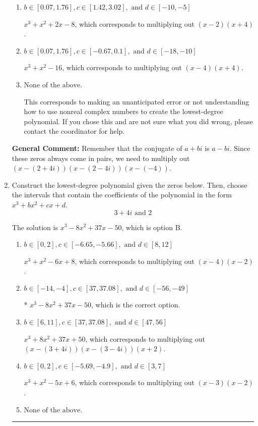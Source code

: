 \documentclass{extbook}[14pt]
\newcommand{\litem}[1]{\item #1

\rule{\textwidth}{0.4pt}}
\begin{document}
\begin{enumerate}
{\begin{enumerate}[label=\Alph*.]
$x^{3} +4 x -80$, which corresponds to multiplying out $(x-(2 + 4 i))(x-(2 - 4 i))(x -4)$.
\item \( b \in [0.07, 1.76], c \in [1.42, 3.02], \text{ and } d \in [-10, -5] \)

$x^{3} + x^{2} +2 x -8$, which corresponds to multiplying out $(x -2)(x + 4)$.
\item \( b \in [0.07, 1.76], c \in [-0.67, 0.1], \text{ and } d \in [-18, -10] \)

$x^{3} + x^{2} -16$, which corresponds to multiplying out $(x -4)(x + 4)$.
\item \( \text{None of the above.} \)

This corresponds to making an unanticipated error or not understanding how to use nonreal complex numbers to create the lowest-degree polynomial. If you chose this and are not sure what you did wrong, please contact the coordinator for help.
\end{enumerate}

\textbf{General Comment:} Remember that the conjugate of $a+bi$ is $a-bi$. Since these zeros always come in pairs, we need to multiply out $(x-(2 + 4 i))(x-(2 - 4 i))(x-(-4))$.
}
\litem{
Construct the lowest-degree polynomial given the zeros below. Then, choose the intervals that contain the coefficients of the polynomial in the form $x^3+bx^2+cx+d$.
\[ 3 + 4 i \text{ and } 2 \]

The solution is \( x^{3} -8 x^{2} +37 x -50 \), which is option B.\begin{enumerate}[label=\Alph*.]
\item \( b \in [0, 2], c \in [-6.65, -5.66], \text{ and } d \in [8, 12] \)

$x^{3} + x^{2} -6 x + 8$, which corresponds to multiplying out $(x -4)(x -2)$.
\item \( b \in [-14, -4], c \in [37, 37.08], \text{ and } d \in [-56, -49] \)

* $x^{3} -8 x^{2} +37 x -50$, which is the correct option.
\item \( b \in [6, 11], c \in [37, 37.08], \text{ and } d \in [47, 56] \)

$x^{3} +8 x^{2} +37 x + 50$, which corresponds to multiplying out $(x-(3 + 4 i))(x-(3 - 4 i))(x + 2)$.
\item \( b \in [0, 2], c \in [-5.69, -4.9], \text{ and } d \in [3, 7] \)

$x^{3} + x^{2} -5 x + 6$, which corresponds to multiplying out $(x -3)(x -2)$.
\item \( \text{None of the above.} \)


\end{enumerate}}
\end{enumerate}
\end{document}
